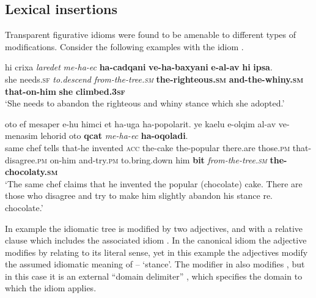 \documentclass[output=paper]{langsci/langscibook}
\begin{document}
\subsection{Lexical insertions}
\label{she:sec:li}
Transparent figurative idioms were found to be amenable to different types of modifications. Consider the following examples with the idiom .

    \ea\label{she:ec-rc-mod}
        \gll hi crixa \textit{laredet} \textit{me-ha-{\ayin}ec} \textbf{ha-cadqani} \textbf{ve-ha-baxyani} \textbf{{\shinB}e-{\ayinB}al-av} \textbf{hi} \textbf{{\tetB}ipsa}.\\
            she needs.\textsc{sf} \textit{to.descend} \textit{from-the-tree.\textsc{sm}} \textbf{the-righteous.\textsc{sm}} \textbf{and-the-whiny.\textsc{sm}} \textbf{that-on-him} \textbf{she} \textbf{climbed.\textsc{3sf}}\\
        \glt `She needs to abandon the righteous and whiny stance which she adopted.'
    \z

    \ea\label{she:ec-ins-int-ext-mod}
        \gll {\alef}oto {\shin}ef mesaper {\shin}e-hu himci {\alef}et ha-{\ayin}uga ha-popolarit. ye{\shin} ka{\alef}elu {\shin}e-{\het}olqim {\ayin}al-av ve-menasim lehorid {\alef}oto \textbf{qcat} \textit{me-ha-{\ayin}ec} \textbf{ha-{\shinB}oqoladi}.\\
            same chef tells that-he invented \textsc{acc} the-cake the-popular there.are those.\textsc{pm} that-disagree.\textsc{pm} on-him and-try.\textsc{pm} to.bring.down him \textbf{bit} \textit{from-the-tree.\textsc{sm}} \textbf{the-chocolaty.\textsc{sm}}\\
        \glt `The same chef claims that he invented the popular (chocolate) cake. There are those who disagree and try to make him slightly abandon his stance re. chocolate.'
    \z

In example  the idiomatic tree is modified by two adjectives, and with a relative clause which includes the associated idiom . In the canonical idiom the adjective  modifies  by relating to its literal sense, yet in this example the adjectives modify the assumed idiomatic meaning of  -- `stance'. The modifier  in  also modifies , but in this case it is an external ``domain delimiter'' \citep{ernst81}, which specifies the domain to which the idiom applies.
\end{document}

